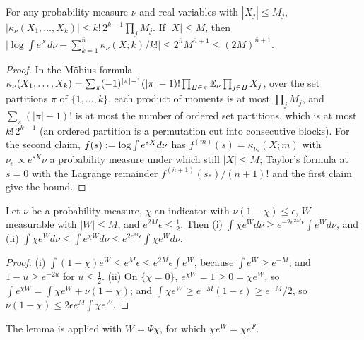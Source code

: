 \begin{lemma}\label{rot:lem:R1cum}
For any probability measure $\nu$ and real variables with $|X_j|\le M_j$, $|\kappa_\nu(X_1,\dots,X_k)|\le k!\,2^{k-1}\prod_jM_j$. If $|X|\le M$, then $\big|\log\int e^{X}d\nu-\sum_{k=1}^{\bar n}\kappa_\nu(X;k)/k!\big|\le2^{\bar n}M^{\bar n+1}\le(2M)^{\bar n+1}$.
\end{lemma}
\begin{proof}
In the M\"obius formula $\kappa_\nu(X_1,\dots,X_k)=\sum_\pi(-1)^{|\pi|-1}(|\pi|-1)!\prod_{B\in\pi}\mathbb E_\nu\prod_{j\in B}X_j$, over the set partitions $\pi$ of $\{1,\dots,k\}$, each product of moments is at most $\prod_jM_j$, and $\sum_\pi(|\pi|-1)!$ is at most the number of ordered set partitions, which is at most $k!\,2^{k-1}$ (an ordered partition is a permutation cut into consecutive blocks). For the second claim, $f(s):=\log\int e^{sX}d\nu$ has $f^{(m)}(s)=\kappa_{\nu_s}(X;m)$ with $\nu_s\propto e^{sX}\nu$ a probability measure under which still $|X|\le M$; Taylor's formula at $s=0$ with the Lagrange remainder $f^{(\bar n+1)}(s_*)/(\bar n+1)!$ and the first claim give the bound.
\end{proof}

\begin{lemma}\label{rot:lem:R1ext}
Let $\nu$ be a probability measure, $\chi$ an indicator with $\nu(1-\chi)\le\epsilon$, $W$ measurable with $|W|\le M$, and $e^{2M}\epsilon\le\frac12$. Then \textup{(i)} $\int\chi e^Wd\nu\ge e^{-2e^{2M}\epsilon}\int e^Wd\nu$, and \textup{(ii)} $\int\chi e^Wd\nu\le\int e^{\chi W}d\nu\le e^{2e^M\epsilon}\int\chi e^Wd\nu$.
\end{lemma}
\begin{proof}
(i) $\int(1-\chi)e^W\le e^M\epsilon\le e^{2M}\epsilon\int e^W$, because $\int e^W\ge e^{-M}$; and $1-u\ge e^{-2u}$ for $u\le\frac12$. (ii) On $\{\chi=0\}$, $e^{\chi W}=1\ge0=\chi e^W$, so $\int e^{\chi W}=\int\chi e^W+\nu(1-\chi)$; and $\int\chi e^W\ge e^{-M}(1-\epsilon)\ge e^{-M}/2$, so $\nu(1-\chi)\le2\epsilon e^M\int\chi e^W$.
\end{proof}
The lemma is applied with $W=\Psi\chi$, for which $\chi e^W=\chi e^\Psi$.

